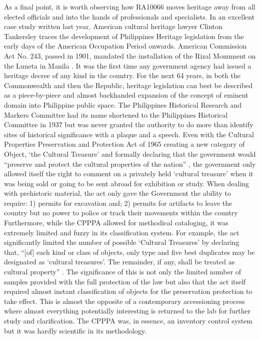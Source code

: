 \documentclass[english]{ijsra}
\begin{document}
As a final point, it is worth observing how RA10066 moves heritage away from all elected officials and into the hands of professionals and specialists.  In an excellent case study written last year, American cultural heritage lawyer Clinton Tankersley traces the development of Philippines Heritage legislation from the early days of the American Occupation Period onwards. American Commission Act No. 243, passed in 1901, mandated the installation of the Rizal Monument on the Luneta in Manila \parencite{Tankersley_2014}. 
It was the first time any government agency had issued a heritage decree of any kind in the country.  For the next 64 years, in both the Commonwealth and then the Republic, heritage legislation can best be described as a piece-by-piece and almost backhanded expansion of the concept of eminent domain into Philippine public space. The Philippines Historical Research and Markers Committee had its name shortened to the Philippines Historical Committee in 1937 but was never granted the authority to do more than identify sites of historical significance with a plaque and a speech. Even with the Cultural Properties Preservation and Protection Act of 1965 \parencite{RA4886} creating a new category of Object, ‘the Cultural Treasure’ and formally declaring that the government would “preserve and protect the cultural properties of the nation” \parencite[1]{RA4886}, 
the government only allowed itself the right to comment on a privately held ‘cultural treasure’ when it was being sold or going to be sent abroad for exhibition or study. When dealing with prehistoric material, the act only gave the Government the ability to require: 1) permits for excavation and; 2) permits for artifacts to leave the country but no power to police or track their movements within the country \parencite[3]{RA4886} Furthermore, while the CPPPA allowed for methodical cataloging, it was extremely limited and fuzzy in its classification system. 
For example, the act significantly limited the number of possible ‘Cultural Treasures’ by declaring that, “[of] each kind or class of objects, only type and five best duplicates may be designated as ‘cultural treasures’. The remainder, if any, shall be treated as cultural property” \parencite[6]{RA4886}. The significance of this is not only the limited number of samples provided with the full protection of the law but also that the act itself required almost instant classification of objects for the preservation protection to take effect. This is almost the opposite of a contemporary accessioning process where almost everything potentially interesting is returned to the lab for further study and clarification. The CPPPA was, in essence, an inventory control system but it was hardly scientific in its methodology.
\end{document}
